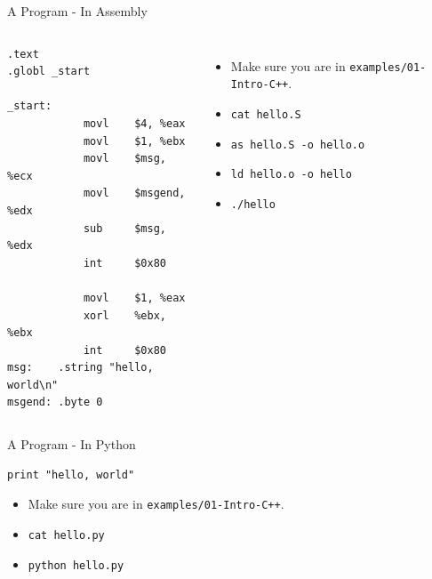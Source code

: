 \documentclass{beamer}
\begin{document}
\begin{frame}[fragile]{A Program - In Assembly}
    \begin{columns}
    \begin{adjustbox}{max height=0.8\textheight, max width=0.95\textwidth}
    \begin{BVerbatim}
.text
.globl _start

_start:
            movl    $4, %eax
            movl    $1, %ebx
            movl    $msg, %ecx
            movl    $msgend, %edx
            sub     $msg, %edx
            int     $0x80

            movl    $1, %eax
            xorl    %ebx, %ebx
            int     $0x80
msg:    .string "hello, world\n"
msgend: .byte 0
    \end{BVerbatim}
    \end{adjustbox}

    \begin{itemize}[<+(1)->]
        \item Make sure you are in {\tt examples/01-Intro-C++}.
        \item {\tt cat hello.S}
        \item {\tt as hello.S -o hello.o}
        \item {\tt ld hello.o -o hello}
        \item {\tt ./hello}
    \end{itemize}
    \end{columns}
\end{frame}

\begin{frame}[fragile]{A Program - In Python}
    \begin{verbatim}
print "hello, world"
    \end{verbatim}

    \begin{itemize}[<+(1)->]
        \item Make sure you are in {\tt examples/01-Intro-C++}.
        \item {\tt cat hello.py}
        \item {\tt python hello.py}
    \end{itemize}
\end{frame}
\end{document}
